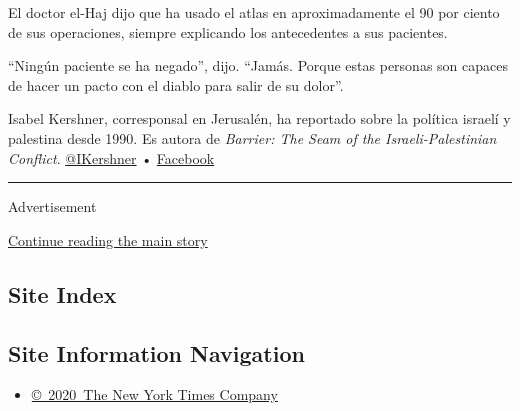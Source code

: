 El doctor el-Haj dijo que ha usado el atlas en aproximadamente el 90 por
ciento de sus operaciones, siempre explicando los antecedentes a sus
pacientes.

``Ningún paciente se ha negado'', dijo. ``Jamás. Porque estas personas
son capaces de hacer un pacto con el diablo para salir de su dolor''.

Isabel Kershner, corresponsal en Jerusalén, ha reportado sobre la
política israelí y palestina desde 1990. Es autora de \emph{Barrier: The
Seam of the Israeli-Palestinian Conflict}.
\href{https://twitter.com/IKershner}{@IKershner} •
\href{https://www.facebook.com/100013443257747}{Facebook}

\begin{center}\rule{0.5\linewidth}{\linethickness}\end{center}

Advertisement

\protect\hyperlink{after-bottom}{Continue reading the main story}

\hypertarget{site-index}{%
\subsection{Site Index}\label{site-index}}

\hypertarget{site-information-navigation}{%
\subsection{Site Information
Navigation}\label{site-information-navigation}}

\begin{itemize}
\tightlist
\item
  \href{https://help.nytimes.com/hc/en-us/articles/115014792127-Copyright-notice}{©~2020~The
  New York Times Company}
\end{itemize}

